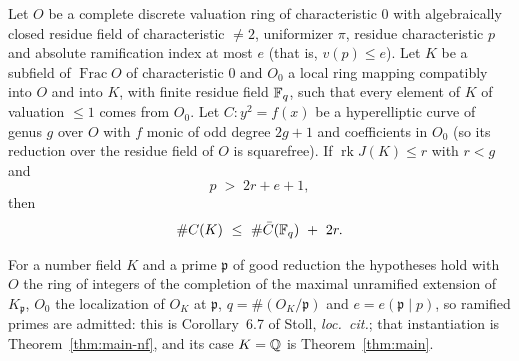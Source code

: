 \begin{theorem}
\label{thm:main-arith}
\leanok
Let $O$ be a complete discrete valuation ring of characteristic $0$ with algebraically
closed residue field of characteristic $\ne 2$, uniformizer $\pi$, residue characteristic
$p$ and absolute ramification index at most $e$ (that is, $v(p) \le e$). Let $K$ be a
subfield of $\operatorname{Frac} O$ of characteristic $0$ and $O_0$ a local ring mapping
compatibly into $O$ and into $K$, with finite residue field $\mathbb{F}_q$, such that every element
of $K$ of valuation $\le 1$ comes from $O_0$. Let $C \colon y^2 = f(x)$ be a hyperelliptic
curve of genus $g$ over $O$ with $f$ monic of odd degree $2g+1$ and coefficients in $O_0$
(so its reduction over the residue field of $O$ is squarefree). If
$\operatorname{rk} J(K) \le r$ with $r < g$ and
\[ p \;>\; 2r + e + 1, \]
then
\[ \#C(K)\ \le\ \#\bar C(\Fq)\ +\ 2r. \]

For a number field $K$ and a prime $\mathfrak p$ of good reduction the
hypotheses hold with $O$ the ring of integers of the completion of the maximal unramified
extension of $K_{\mathfrak p}$, $O_0$ the localization of $O_K$ at $\mathfrak p$,
$q = \#(O_K/\mathfrak p)$ and $e = e(\mathfrak p \mid p)$, so ramified primes are admitted:
this is Corollary~6.7 of Stoll, \emph{loc.\ cit.}; that instantiation is
Theorem~\ref{thm:main-nf}, and its case $K = \mathbb{Q}$ is Theorem~\ref{thm:main}.
\end{theorem}
